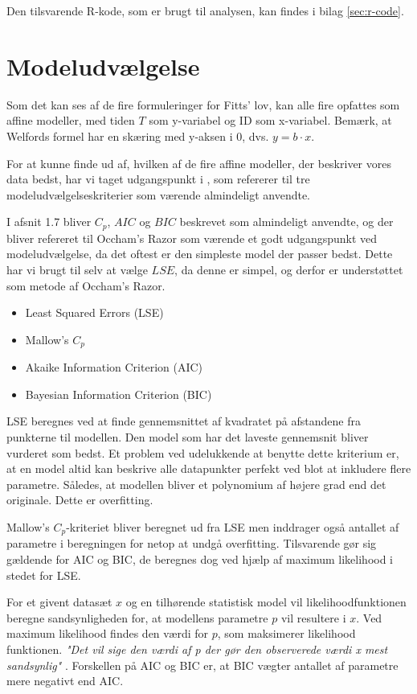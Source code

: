 Den tilsvarende R-kode, som er brugt til analysen, kan findes i bilag \ref{sec:r-code}.
\section*{Modeludvælgelse}
Som det kan ses af de fire formuleringer for Fitts' lov, kan alle fire opfattes som affine modeller, med tiden $T$ som y-variabel og ID som x-variabel. Bemærk, at Welfords formel har en skæring med y-aksen i 0, dvs. $y=b\cdot x$.

For at kunne finde ud af, hvilken af de fire affine modeller, der beskriver vores data bedst, har vi taget udgangspunkt i \cite{wu2011experiments}, som refererer til tre modeludvælgelseskriterier som værende almindeligt anvendte.

I \cite{wu2011experiments} afsnit 1.7 bliver $C_p$, $AIC$ og $BIC$ beskrevet som almindeligt anvendte, og der bliver refereret til Occham's Razor som værende et godt udgangspunkt ved modeludvælgelse, da det oftest er den simpleste model der passer bedst. Dette har vi brugt til selv at vælge $LSE$, da denne er simpel, og derfor er understøttet som metode af Occham's Razor.
\begin{itemize}
\item{Least Squared Errors (LSE) \cite{legendre1805}}
\item{Mallow's $C_p$ \cite{mallow1973}}
\item{Akaike Information Criterion (AIC) \cite{akaike1973}}
\item{Bayesian Information Criterion (BIC) \cite{schwarz1978}}
\end{itemize}
LSE beregnes ved at finde gennemsnittet af kvadratet på afstandene fra punkterne til modellen. Den model som har det laveste gennemsnit bliver vurderet som bedst. Et problem ved udelukkende at benytte dette kriterium er, at en model altid kan beskrive alle datapunkter perfekt ved blot at inkludere flere parametre. Således, at modellen bliver et polynomium af højere grad end det originale. Dette er overfitting.

Mallow's $C_p$-kriteriet bliver beregnet ud fra LSE men inddrager også antallet af parametre i beregningen for netop at undgå overfitting. Tilsvarende gør sig gældende for AIC og BIC, de beregnes dog ved hjælp af maximum likelihood i stedet for LSE.

For et givent datasæt $x$ og en tilhørende statistisk model vil likelihoodfunktionen beregne sandsynligheden for, at modellens parametre $p$ vil resultere i $x$. Ved maximum likelihood findes den værdi for  $p$, som maksimerer likelihood funktionen. \textit{"Det vil sige den v{\ae}rdi af  p der gør den observerede v{\ae}rdi x mest sandsynlig"} \cite[s.14]{ditlevsen2011}. Forskellen på AIC og BIC er, at BIC vægter antallet af parametre mere negativt end AIC.

